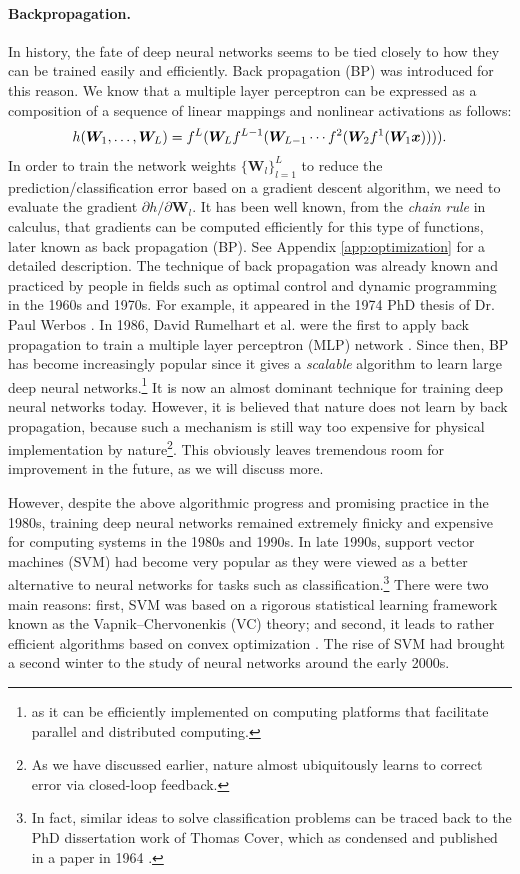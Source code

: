 \documentclass[../../book-main.tex]{subfiles}
\begin{document}
\paragraph{Backpropagation.}
In history, the fate of deep neural networks seems to be tied closely to how they can be trained easily and efficiently. Back propagation (BP) was introduced for this reason. We know that a multiple layer perceptron can be expressed as a  composition of a sequence of linear mappings and nonlinear activations as follows:
\begin{equation}
h(\bm W_1, \ldots, \bm W_L) = f^L(\bm W_Lf^{L-1}(\bm W_{L-1} \cdots f^2(\bm W_2f^1(\bm W_1\bm{x})))).
\end{equation}
In order to train the network weights $\{\bm W_l\}_{l=1}^L$ to reduce the prediction/classification error based on a gradient descent algorithm, we need to evaluate the gradient ${\partial h}/{\partial \bm W_l}$. It has been well known, from the {\em chain rule} in calculus, that gradients can be computed efficiently for this type of functions, later known as back propagation (BP). See Appendix \ref{app:optimization} for a detailed description. The technique of back propagation was already known and practiced by people in fields such as optimal control and dynamic programming in the 1960s and 1970s. For example, it appeared in the 1974 PhD thesis of Dr. Paul Werbos \cite{Werbos-1974, Werbos1994TheRO}. In 1986, David Rumelhart et al. were the first to apply back propagation  to train a multiple layer perceptron (MLP) network \cite{Rumelhart1986}. Since then,  BP has become increasingly popular since it gives a {\em scalable} algorithm to learn large deep neural networks.\footnote{as it can be efficiently implemented on computing platforms that facilitate parallel and distributed computing.} It is now an almost dominant technique for training deep neural networks today. However, it is believed that nature does not learn by back propagation,  because such a mechanism is still way too expensive for physical implementation by nature\footnote{As we have discussed earlier, nature almost ubiquitously learns to correct error via closed-loop feedback.}. This obviously leaves tremendous room for improvement in the future, as we will discuss more.

However, despite the above algorithmic progress and promising practice in the 1980s, training deep neural networks remained extremely finicky and expensive for computing systems in the 1980s and 1990s. In late 1990s, support vector machines (SVM) \cite{SVM-1995} had become very popular as they were viewed as a better alternative to neural networks for tasks such as classification.\footnote{In fact, similar ideas to solve classification problems can be traced back to the PhD dissertation work of Thomas Cover, which as condensed and published in a paper in 1964  \cite{Cover-1964}.} There were two main reasons: first, SVM was based on a rigorous statistical learning framework known as the Vapnik--Chervonenkis (VC) theory; and second, it leads to rather efficient algorithms based on convex optimization \cite{BoydVa04}. The rise of SVM had brought a second winter to the study of neural networks around the early 2000s. 
\end{document}
